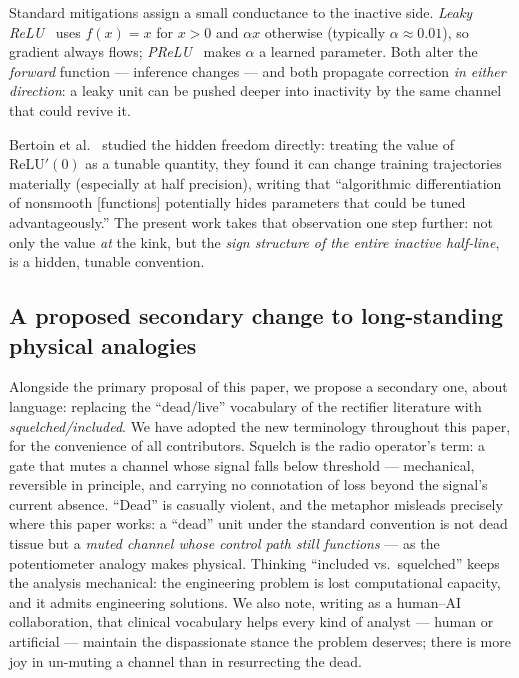 \documentclass[11pt]{article}
\newcommand{\relu}{\mathrm{ReLU}}
\begin{document}
Standard mitigations assign a small conductance to the inactive side.
\emph{Leaky ReLU}~\cite{maas2013leaky} uses $f(x) = x$ for $x > 0$ and $\alpha x$ otherwise
(typically $\alpha \approx 0.01$), so gradient always flows; \emph{PReLU}~\cite{he2015prelu}
makes $\alpha$ a learned parameter. Both alter the \emph{forward} function
--- inference changes --- and both propagate correction \emph{in either
direction}: a leaky unit can be pushed deeper into inactivity by the same
channel that could revive it.

Bertoin et al.\ \cite{bertoin2021} studied the hidden freedom directly:
treating the value of $\relu'(0)$ as a tunable quantity, they found it
can change training trajectories materially (especially at half
precision), writing that ``algorithmic differentiation of nonsmooth
[functions] potentially hides parameters that could be tuned
advantageously.'' The present work takes that observation one step
further: not only the value \emph{at} the kink, but the \emph{sign
structure of the entire inactive half-line}, is a hidden, tunable
convention.

\subsection{A proposed secondary change to long-standing physical
analogies}
\label{sec:terminology}

Alongside the primary proposal of this paper, we propose a secondary
one, about language: replacing the ``dead/live'' vocabulary of the
rectifier literature with \emph{squelched/included}. We have adopted
the new terminology throughout this paper, for the convenience of all
contributors. Squelch is the radio operator's term: a gate
that mutes a channel whose signal falls below threshold --- mechanical,
reversible in principle, and carrying no connotation of loss beyond the
signal's current absence. ``Dead'' is casually violent, and the metaphor
misleads precisely where this paper works: a ``dead'' unit under the
standard convention is not dead tissue but a \emph{muted channel whose
control path still functions} --- as the potentiometer analogy makes
physical. Thinking ``included vs.\ squelched'' keeps the analysis
mechanical: the engineering problem is lost computational capacity, and
it admits engineering solutions. We also note, writing as a human--AI
collaboration, that clinical vocabulary helps every kind of analyst ---
human or artificial --- maintain the dispassionate stance the problem
deserves; there is more joy in un-muting a channel than in resurrecting
the dead.
\end{document}
